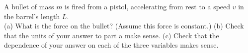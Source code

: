 A bullet of mass $m$ is fired from a pistol, accelerating from rest to a
speed $v$ in the barrel's length $L$.\\
%
(a) What is the force on the bullet? (Assume this force is constant.)\answercheck\hwendpart
%
(b) Check that the units of your answer to part a make sense.\hwendpart
%
(c) Check that the dependence of your answer on each of the three variables
makes sense.
